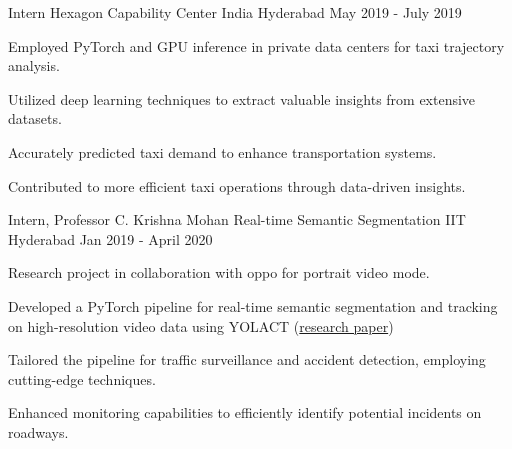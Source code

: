 \begin{cventries}
\cventry
    {Intern} %
    {Hexagon Capability Center India} %
    {Hyderabad} %
    {May 2019 - July 2019} %
    {
    \begin{cvitems}
        \item Employed PyTorch and GPU inference in private data centers for taxi trajectory analysis.
        \item Utilized deep learning techniques to extract valuable insights from extensive datasets.
        \item Accurately predicted taxi demand to enhance transportation systems.
        \item Contributed to more efficient taxi operations through data-driven insights.
    \end{cvitems}
    }

\cventry
    {Intern, Professor C. Krishna Mohan} %
    {Real-time Semantic Segmentation} %
    {IIT Hyderabad} %
    {Jan 2019 - April 2020} %
    {
    \begin{cvitems}
        \item Research project in collaboration with oppo for portrait video mode.
        \item Developed a PyTorch pipeline for real-time semantic segmentation and tracking on high-resolution video data using YOLACT (\href{https://arxiv.org/abs/1904.02689}{research paper})
        \item Tailored the pipeline for traffic surveillance and accident detection, employing cutting-edge techniques.
        \item Enhanced monitoring capabilities to efficiently identify potential incidents on roadways.
    \end{cvitems}
    }

\end{cventries}
